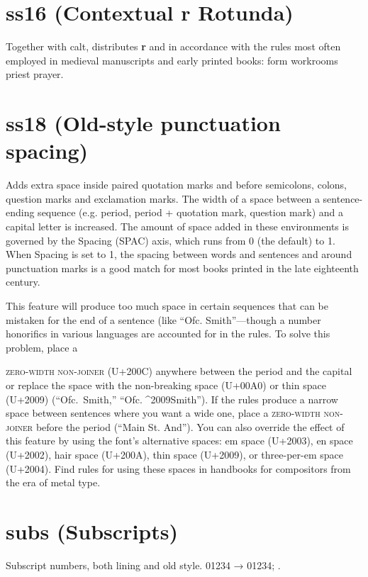 \documentclass[12pt,letterpaper,openany]{book}
\begin{document}
\section{ss16 (Contextual r Rotunda)}
Together with calt, distributes \textbf{r} and
\textbf{} in accordance with the rules most often employed in medieval manuscripts and early printed books: { form workrooms priest prayer}.

\section{ss18 (Old-style punctuation spacing)}
{\spaced{} Adds extra space inside paired quotation marks and before semicolons, colons, question
marks and exclamation marks. The width of a space between a sentence-ending sequence
(e.g. period, period + quotation mark, question mark) and a capital letter is increased.
The amount of space added in these environments is governed by the Spacing (SPAC) axis,
which runs from 0 (the default) to 1. When Spacing is set to 1, the spacing between
words and sentences and around punctuation marks is a good match for most books
printed in the late eighteenth century.

This feature will produce too much space in certain sequences that can be mistaken
for the end of a sentence (like “Ofc. Smith”—though a number
honorifics in various languages are accounted for in the rules. To solve this problem, place a}
\textsc{zero-width non-joiner }{\spaced{}(U+200C) anywhere between the period and the capital
or replace the space with the non-breaking space (U+00A0) or thin space (U+2009) (“Ofc.^^a0Smith,” “Ofc.^^^^2009Smith”). If
the rules produce a narrow space between sentences where you want a wide one,
place a }\textsc{zero-width non-joiner} {\spaced{}before the period (“Main St\/. And”).
You can also override the effect of this feature by using the font’s alternative
spaces: em space (U+2003), en space (U+2002), hair space (U+200A), thin space (U+2009),
or three-per-em space (U+2004). Find rules for using these spaces in
handbooks for compositors from the era of metal type.}


\section{subs (Subscripts)}
Subscript numbers, both lining and old style. 01234 →
{ 01234};
.
\end{document}
